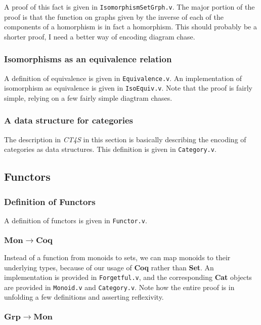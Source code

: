 \documentclass[12pt,twocolumn,oneside]{book}
\begin{document}
A proof of this fact is given in \texttt{IsomorphismSetGrph.v}. The major portion of the
proof is that the function on graphs given by the inverse of each of the components
of a homorphism is in fact a homorphism. This should probably be a shorter proof,
I need a better way of encoding diagram chase.

\subsubsection{Isomorphisms as an equivalence relation}

A definition of equivalence is given in \texttt{Equivalence.v}. An implementation
of isomorphism as equivalence is given in \texttt{IsoEquiv.v}. Note that the proof
is fairly simple, relying on a few fairly simple diagtram chases.

\subsubsection{A data structure for categories}

The description in \emph{CT4S} in this section is basically describing the encoding
of categories as data structures. This definition is given in \texttt{Category.v}.

\subsection{Functors}

\subsubsection{Definition of Functors}

A definition of functors is given in \texttt{Functor.v}.

\subsubsection{$\mathbf{Mon} \to \mathbf{Coq}$}

Instead of a function from monoids to sets, we can map monoids to their underlying types, because
of our usage of \textbf{Coq} rather than \textbf{Set}. An implementation is provided
in \texttt{Forgetful.v}, and the corresponding \textbf{Cat} objects are provided in \texttt{Monoid.v}
and \texttt{Category.v}. Note how the entire proof is in unfolding a few definitions and
asserting reflexivity.

\subsubsection{$\mathbf{Grp} \to \mathbf{Mon}$}
\end{document}
